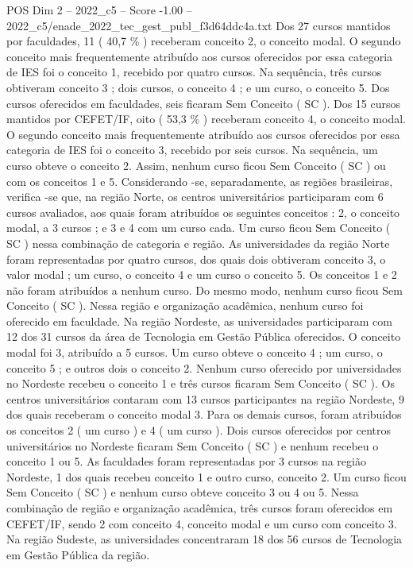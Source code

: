 \begin{textsample}{POS Dim 2 – 2022\_c5 – Score -1.00 – 2022\_c5/enade\_2022\_tec\_gest\_publ\_f3d64ddc4a.txt}
Dos 27 cursos mantidos por faculdades, 11 ( 40,7 \% ) receberam conceito 2, o conceito modal.
O segundo conceito mais frequentemente atribuído aos cursos oferecidos por essa categoria de IES foi o conceito 1, recebido por quatro cursos.
Na sequência, três cursos obtiveram conceito 3 ; dois cursos, o conceito 4 ; e um curso, o conceito 5.
Dos cursos oferecidos em faculdades, seis ficaram Sem Conceito ( SC ).
Dos 15 cursos mantidos por CEFET/IF, oito ( 53,3 \% ) receberam conceito 4, o conceito modal.
O segundo conceito mais frequentemente atribuído aos cursos oferecidos por essa categoria de IES foi o conceito 3, recebido por seis cursos.
Na sequência, um curso obteve o conceito 2.
Assim, nenhum curso ficou Sem Conceito ( SC ) ou com os conceitos 1 e 5.
Considerando -se, separadamente, as regiões brasileiras, verifica -se que, na região Norte, os centros universitários participaram com 6 cursos avaliados, aos quais foram atribuídos os seguintes conceitos : 2, o conceito modal, a 3 cursos ; e 3 e 4 com um curso cada.
Um curso ficou Sem Conceito ( SC ) nessa combinação de categoria e região.
As universidades da região Norte foram representadas por quatro cursos, dos quais dois obtiveram conceito 3, o valor modal ; um curso, o conceito 4 e um curso o conceito 5.
Os conceitos 1 e 2 não foram atribuídos a nenhum curso.
Do mesmo modo, nenhum curso ficou Sem Conceito ( SC ).
Nessa região e organização acadêmica, nenhum curso foi oferecido em faculdade.
Na região Nordeste, as universidades participaram com 12 dos 31 cursos da área de Tecnologia em Gestão Pública oferecidos.
O conceito modal foi 3, atribuído a 5 cursos.
Um curso obteve o conceito 4 ; um curso, o conceito 5 ; e outros dois o conceito 2.
Nenhum curso oferecido por universidades no Nordeste recebeu o conceito 1 e três cursos ficaram Sem Conceito ( SC ).
Os centros universitários contaram com 13 cursos participantes na região Nordeste, 9 dos quais receberam o conceito modal 3.
Para os demais cursos, foram atribuídos os conceitos 2 ( um curso ) e 4 ( um curso ).
Dois cursos oferecidos por centros universitários no Nordeste ficaram Sem Conceito ( SC ) e nenhum recebeu o conceito 1 ou 5.
As faculdades foram representadas por 3 cursos na região Nordeste, 1 dos quais recebeu conceito 1 e outro curso, conceito 2.
Um curso ficou Sem Conceito ( SC ) e nenhum curso obteve conceito 3 ou 4 ou 5.
Nessa combinação de região e organização acadêmica, três cursos foram oferecidos em CEFET/IF, sendo 2 com conceito 4, conceito modal e um curso com conceito 3.
Na região Sudeste, as universidades concentraram 18 dos 56 cursos de Tecnologia em Gestão Pública da região.

\end{textsample}
